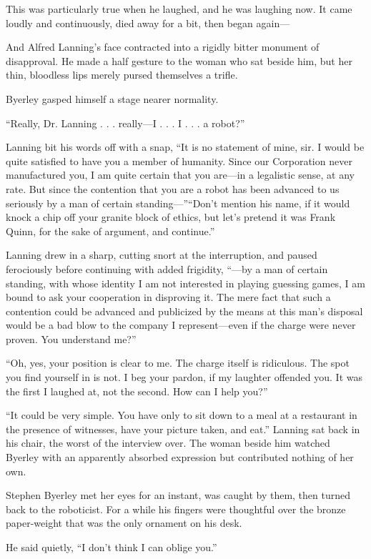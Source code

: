 \documentclass[10pt,a5paper,twoside]{book}
\begin{document}
This was particularly true when he laughed, and he was laughing now. It came loudly and continuously, died away for a bit, then began again—

And Alfred Lanning’s face contracted into a rigidly bitter monument of disapproval. He made a half gesture to the woman who sat beside him, but her thin, bloodless lips merely pursed themselves a trifle.

Byerley gasped himself a stage nearer normality.

“Really, Dr. Lanning . . . really—I . . . I . . . a robot?”

Lanning bit his words off with a snap, “It is no statement of mine, sir. I would be quite satisfied to have you a member of humanity. Since our Corporation never manufactured you, I am quite certain that you are—in a legalistic sense, at any rate. But since the contention that you are a robot has been advanced to us seriously by a man of certain standing—”“Don’t mention his name, if it would knock a chip off your granite block of ethics, but let’s pretend it was Frank Quinn, for the sake of argument, and continue.”

Lanning drew in a sharp, cutting snort at the interruption, and paused ferociously before continuing with added frigidity, “—by a man of certain standing, with whose identity I am not interested in playing guessing games, I am bound to ask your cooperation in disproving it. The mere fact that such a contention could be advanced and publicized by the means at this man’s disposal would be a bad blow to the company I represent—even if the charge were never proven. You understand me?”

“Oh, yes, your position is clear to me. The charge itself is ridiculous. The spot you find yourself in is not. I beg your pardon, if my laughter offended you. It was the first I laughed at, not the second. How can I help you?”

“It could be very simple. You have only to sit down to a meal at a restaurant in the presence of witnesses, have your picture taken, and eat.” Lanning sat back in his chair, the worst of the interview over. The woman beside him watched Byerley with an apparently absorbed expression but contributed nothing of her own.

Stephen Byerley met her eyes for an instant, was caught by them, then turned back to the roboticist. For a while his fingers were thoughtful over the bronze paper-weight that was the only ornament on his desk.

He said quietly, “I don’t think I can oblige you.”
\end{document}
